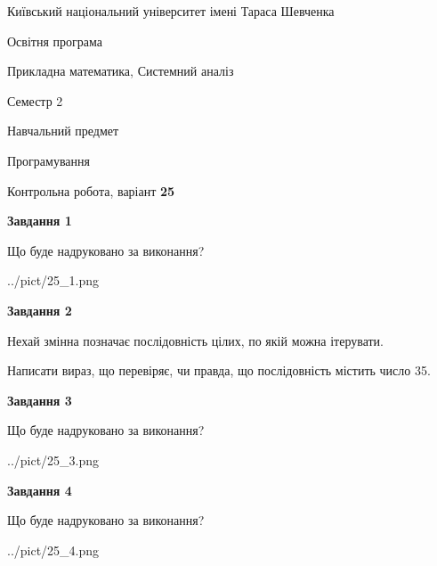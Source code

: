 \documentclass[12pt, ukrainian]{article}
\begin{document}
{{\begin {small}\par
{ \center  Київський національний університет імені Тараса Шевченка \par}
{\parbox {5 cm}{Освітня програма \hfill}{\parbox {8 cm}{Прикладна математика, Системний аналіз \hfill}}\parbox {5 cm}{\hfill Семестр 2}}\par
{\parbox {5 cm} {Навчальний предмет \hfill}\parbox {7 cm}{Програмування \hfill}\parbox {6cm}{\hfill}\par}\vspace{-7pt} \end{small}}{\center Контрольна робота, варіант  \No \textbf
{ 25 }\par}}
{
\begin {large}
{\begin {center}\textbf{Завдання 1}\end {center}}\par
Що буде надруковано за виконання?\par\par
\begin{center}
	{../pict/25_1.png}
\end{center}
\newpage

{\begin {center}\textbf{Завдання 2}\end {center}}\par
Нехай змінна  позначає послідовність цілих, по якій можна ітерувати.

Написати вираз, що перевіряє, чи правда, що послідовність  містить число 35.\par
\newpage

{\begin {center}\textbf{Завдання 3}\end {center}}\par
Що буде надруковано за виконання?
\begin{center}
	{../pict/25_3.png}
\end{center}
\newpage

{\begin {center}\textbf{Завдання 4}\end {center}}\par
Що буде надруковано за виконання?\par
\begin{center}
	{../pict/25_4.png}
\end{center}
\newpage


\end{large}}
\end{document}
